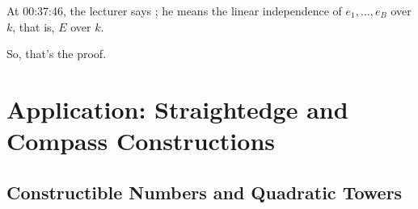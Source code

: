 \begin{aiNote}
At 00:37:46, the lecturer says ; he means the linear independence of $e_1, \dots, e_B$ over $k$, that is, $E$ over $k$.
\end{aiNote}

\begin{speech}[00:37:58 - 00:38:08]
So, that's the proof.
\end{speech}

\section{Application: Straightedge and Compass Constructions}

\subsection{Constructible Numbers and Quadratic Towers}

